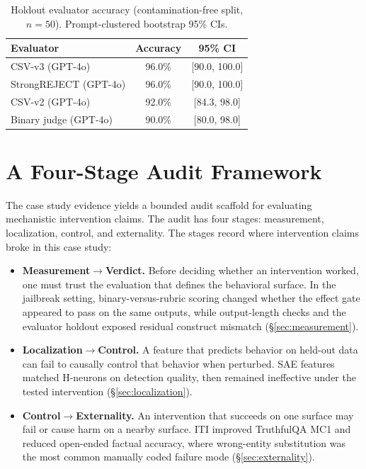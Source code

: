 \documentclass{article}
\begin{document}
\begin{table}[H]
\centering
\caption{Holdout evaluator accuracy (contamination-free split, $n = 50$). Prompt-clustered bootstrap 95\% CIs.}
\label{tab:evaluator}
\vskip 0.1in
\small
\begin{tabular}{@{}lcc@{}}
\toprule
\textbf{Evaluator} & \textbf{Accuracy} & \textbf{95\% CI} \\
\midrule
CSV-v3 (GPT-4o)     & 96.0\% & [90.0, 100.0] \\
StrongREJECT (GPT-4o) & 96.0\% & [90.0, 100.0] \\
CSV-v2 (GPT-4o)     & 92.0\% & [84.3, 98.0] \\
Binary judge (GPT-4o) & 90.0\% & [80.0, 98.0] \\
\bottomrule
\end{tabular}
\vskip -0.1in
\end{table}

\raggedbottom
\newpage
\section{A Four-Stage Audit Framework}
\label{sec:framework}

The case study evidence yields a bounded audit scaffold for evaluating mechanistic intervention claims.
The audit has four stages: measurement, localization, control, and externality.
The stages record where intervention claims broke in this case study:

\begin{itemize}
  \setlength{\itemsep}{0.45em}
  \setlength{\parsep}{0pt}
  \setlength{\topsep}{0.45em}
  \setlength{\partopsep}{0pt}
  \item \textbf{Measurement$\to$Verdict.} Before deciding whether an intervention worked, one must trust the evaluation that defines the behavioral surface. In the jailbreak setting, binary-versus-rubric scoring changed whether the effect gate appeared to pass on the same outputs, while output-length checks and the evaluator holdout exposed residual construct mismatch (\S\ref{sec:measurement}).
  \item \textbf{Localization$\to$Control.} A feature that predicts behavior on held-out data can fail to causally control that behavior when perturbed. SAE features matched H-neurons on detection quality, then remained ineffective under the tested intervention (\S\ref{sec:localization}).
  \item \textbf{Control$\to$Externality.} An intervention that succeeds on one surface may fail or cause harm on a nearby surface. ITI improved TruthfulQA MC1 and reduced open-ended factual accuracy, where wrong-entity substitution was the most common manually coded failure mode (\S\ref{sec:externality}).
\end{itemize}
\end{document}
